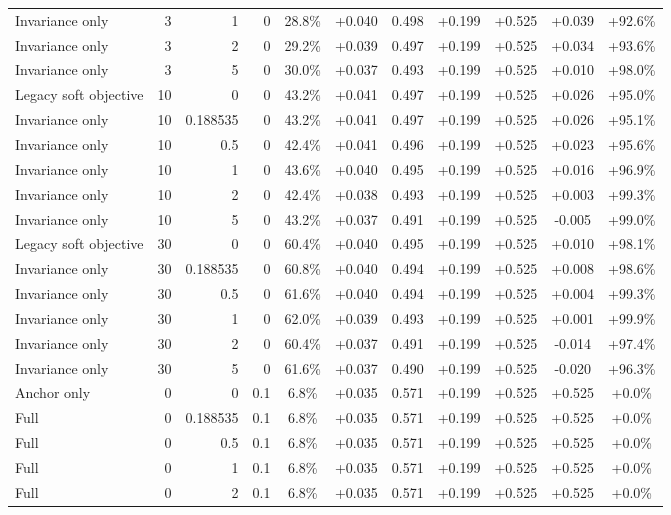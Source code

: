 \begin{table}[htbp]
\begin{tabular}{lrrrccccccc}
Invariance only & 3 & 1 & 0 & 28.8\% & +0.040 & 0.498 & +0.199 & +0.525 & +0.039 & +92.6\% \\
Invariance only & 3 & 2 & 0 & 29.2\% & +0.039 & 0.497 & +0.199 & +0.525 & +0.034 & +93.6\% \\
Invariance only & 3 & 5 & 0 & 30.0\% & +0.037 & 0.493 & +0.199 & +0.525 & +0.010 & +98.0\% \\
Legacy soft objective & 10 & 0 & 0 & 43.2\% & +0.041 & 0.497 & +0.199 & +0.525 & +0.026 & +95.0\% \\
Invariance only & 10 & 0.188535 & 0 & 43.2\% & +0.041 & 0.497 & +0.199 & +0.525 & +0.026 & +95.1\% \\
Invariance only & 10 & 0.5 & 0 & 42.4\% & +0.041 & 0.496 & +0.199 & +0.525 & +0.023 & +95.6\% \\
Invariance only & 10 & 1 & 0 & 43.6\% & +0.040 & 0.495 & +0.199 & +0.525 & +0.016 & +96.9\% \\
Invariance only & 10 & 2 & 0 & 42.4\% & +0.038 & 0.493 & +0.199 & +0.525 & +0.003 & +99.3\% \\
Invariance only & 10 & 5 & 0 & 43.2\% & +0.037 & 0.491 & +0.199 & +0.525 & -0.005 & +99.0\% \\
Legacy soft objective & 30 & 0 & 0 & 60.4\% & +0.040 & 0.495 & +0.199 & +0.525 & +0.010 & +98.1\% \\
Invariance only & 30 & 0.188535 & 0 & 60.8\% & +0.040 & 0.494 & +0.199 & +0.525 & +0.008 & +98.6\% \\
Invariance only & 30 & 0.5 & 0 & 61.6\% & +0.040 & 0.494 & +0.199 & +0.525 & +0.004 & +99.3\% \\
Invariance only & 30 & 1 & 0 & 62.0\% & +0.039 & 0.493 & +0.199 & +0.525 & +0.001 & +99.9\% \\
Invariance only & 30 & 2 & 0 & 60.4\% & +0.037 & 0.491 & +0.199 & +0.525 & -0.014 & +97.4\% \\
Invariance only & 30 & 5 & 0 & 61.6\% & +0.037 & 0.490 & +0.199 & +0.525 & -0.020 & +96.3\% \\
Anchor only & 0 & 0 & 0.1 & 6.8\% & +0.035 & 0.571 & +0.199 & +0.525 & +0.525 & +0.0\% \\
Full & 0 & 0.188535 & 0.1 & 6.8\% & +0.035 & 0.571 & +0.199 & +0.525 & +0.525 & +0.0\% \\
Full & 0 & 0.5 & 0.1 & 6.8\% & +0.035 & 0.571 & +0.199 & +0.525 & +0.525 & +0.0\% \\
Full & 0 & 1 & 0.1 & 6.8\% & +0.035 & 0.571 & +0.199 & +0.525 & +0.525 & +0.0\% \\
Full & 0 & 2 & 0.1 & 6.8\% & +0.035 & 0.571 & +0.199 & +0.525 & +0.525 & +0.0\% \\

\end{tabular}
\end{table}
